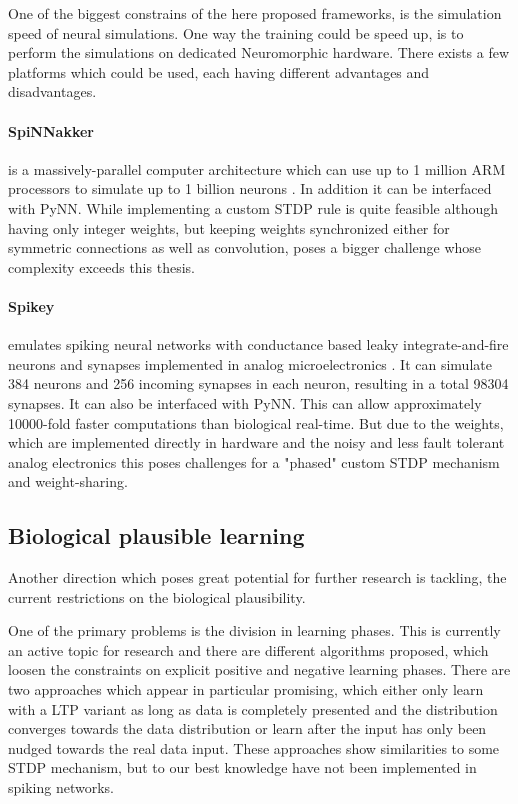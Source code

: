 One of the biggest constrains of the here proposed frameworks, is the simulation speed of neural simulations.
One way the training could be speed up, is to perform the simulations on dedicated Neuromorphic hardware. 
There exists a few platforms which could be used, each having different advantages and disadvantages.

\paragraph{SpiNNakker} is a massively-parallel computer architecture which can use up to 1 million ARM processors to simulate up to 1 billion neurons \cite{jin2008efficient}. 
In addition it can be interfaced with PyNN. 
While implementing a custom STDP rule is quite feasible although having only integer weights, but keeping weights synchronized either for symmetric connections as well as convolution, poses a bigger challenge whose complexity exceeds this thesis.

\paragraph{Spikey} emulates spiking neural networks with conductance based leaky integrate-and-fire neurons and synapses implemented in analog microelectronics \cite{Pfeil1311}.
It can simulate 384 neurons and 256 incoming synapses in each neuron, resulting in a total 98304 synapses.
It can also be interfaced with PyNN.
This can allow approximately 10000-fold faster computations than biological real-time.
But due to the weights, which are implemented directly in hardware and the noisy and less fault tolerant analog electronics this poses challenges for a "phased" custom STDP mechanism and weight-sharing. 

\subsection{Biological plausible learning}

Another direction which poses great potential for further research is tackling, the current restrictions on the biological plausibility.  

One of the primary problems is the division in learning phases.
This is currently an active topic for research and there are different algorithms proposed, which loosen the constraints on explicit positive and negative learning phases.
There are two approaches which appear in particular promising, which either only learn with a LTP variant as long as data is completely presented and the distribution converges towards the data distribution or learn after the input has only been nudged towards the real data input\cite{DBLP:journals/corr/ScellierB16}\cite{Scellier2016a}.
These approaches show similarities to some STDP mechanism, but to our best knowledge have not been implemented in spiking networks.

